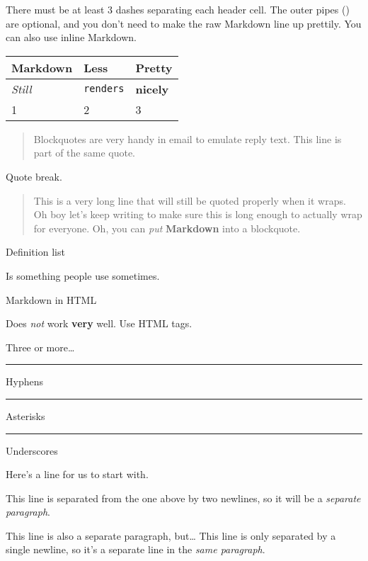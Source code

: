 \documentclass[
]{article}
\begin{document}
There must be at least 3 dashes separating each header cell. The outer
pipes (\textbar) are optional, and you don't need to make the raw
Markdown line up prettily. You can also use inline Markdown.

\begin{longtable}[]{@{}lll@{}}
\toprule\noalign{}
Markdown & Less & Pretty \\
\midrule\noalign{}
\endhead
\bottomrule\noalign{}
\endlastfoot
\emph{Still} & \texttt{renders} & \textbf{nicely} \\
1 & 2 & 3 \\
\end{longtable}

\begin{quote}
Blockquotes are very handy in email to emulate reply text. This line is
part of the same quote.
\end{quote}

Quote break.

\begin{quote}
This is a very long line that will still be quoted properly when it
wraps. Oh boy let's keep writing to make sure this is long enough to
actually wrap for everyone. Oh, you can \emph{put} \textbf{Markdown}
into a blockquote.
\end{quote}

Definition list

Is something people use sometimes.

Markdown in HTML

Does \emph{not} work \textbf{very} well. Use HTML tags.

Three or more\ldots{}

\begin{center}\rule{0.5\linewidth}{0.5pt}\end{center}

Hyphens

\begin{center}\rule{0.5\linewidth}{0.5pt}\end{center}

Asterisks

\begin{center}\rule{0.5\linewidth}{0.5pt}\end{center}

Underscores

Here's a line for us to start with.

This line is separated from the one above by two newlines, so it will be
a \emph{separate paragraph}.

This line is also a separate paragraph, but\ldots{} This line is only
separated by a single newline, so it's a separate line in the \emph{same
paragraph}.
\end{document}
